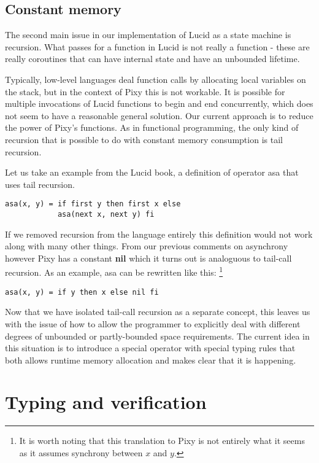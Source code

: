 \documentclass{scrartcl}
\begin{document}
    \subsection{Constant memory}

    The second main issue in our implementation of Lucid as a state machine is recursion. What passes for a function in Lucid is not really a function - these are really coroutines that can have internal state and have an unbounded lifetime.

    Typically, low-level languages deal function calls by allocating local variables on the stack, but in the context of Pixy this is not workable. It is possible for multiple invocations of Lucid functions to begin and end concurrently, which does not seem to have a reasonable general solution. Our current approach is to reduce the power of Pixy's functions. As in functional programming, the only kind of recursion that is possible to do with constant memory consumption is tail recursion.

    Let us take an example from the Lucid book, a definition of operator asa that uses tail recursion.
    \begin{lstlisting}
asa(x, y) = if first y then first x else
            asa(next x, next y) fi
    \end{lstlisting}

    If we removed recursion from the language entirely this definition would not work along with many other things. From our previous comments on asynchrony however Pixy has a constant \textbf{nil} which it turns out is analoguous to tail-call recursion. As an example, asa can be rewritten like this:
    \footnote{It is worth noting that this translation to Pixy is not entirely what it seems as it assumes synchrony between $x$ and $y$.}
    \begin{lstlisting}
asa(x, y) = if y then x else nil fi
    \end{lstlisting}

    Now that we have isolated tail-call recursion as a separate concept, this leaves us with the issue of how to allow the programmer to explicitly deal with different degrees of unbounded or partly-bounded space requirements. The current idea in this situation is to introduce a special operator with special typing rules that both allows runtime memory allocation and makes clear that it is happening.

    \section{Typing and verification}
\end{document}
